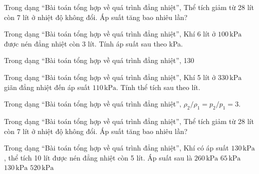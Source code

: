 \begin{bt}
Trong dạng “Bài toán tổng hợp về quá trình đẳng nhiệt”, Thể tích giảm từ 28 lít còn 7 lít ở nhiệt độ không đổi. Áp suất tăng bao nhiêu lần?
\end{bt}

\begin{ex}
Trong dạng “Bài toán tổng hợp về quá trình đẳng nhiệt”, Khí 6 lít ở $100\,\text{kPa}$ được nén đẳng nhiệt còn 3 lít. Tính áp suất sau theo kPa.
\end{ex}

\begin{bt}
Trong dạng “Bài toán tổng hợp về quá trình đẳng nhiệt”, 130
\end{bt}

\begin{ex}
Trong dạng “Bài toán tổng hợp về quá trình đẳng nhiệt”, Khí 5 lít ở $330\,\text{kPa}$ giãn đẳng nhiệt đến áp suất $110\,\text{kPa}$. Tính thể tích sau theo lít.
\end{ex}

\begin{bt}
Trong dạng “Bài toán tổng hợp về quá trình đẳng nhiệt”, $\rho_2/\rho_1=p_2/p_1=3$.
\end{bt}

\begin{ex}
Trong dạng “Bài toán tổng hợp về quá trình đẳng nhiệt”, Thể tích giảm từ 28 lít còn 7 lít ở nhiệt độ không đổi. Áp suất tăng bao nhiêu lần?
\end{ex}

\begin{ex}
Trong dạng “Bài toán tổng hợp về quá trình đẳng nhiệt”, Khí có áp suất $130\,\text{kPa}$, thể tích 10 lít được nén đẳng nhiệt còn 5 lít. Áp suất sau là
\choice
{\True $260\,\text{kPa}$}
{$65\,\text{kPa}$}
{$130\,\text{kPa}$}
{$520\,\text{kPa}$}
\end{ex}

